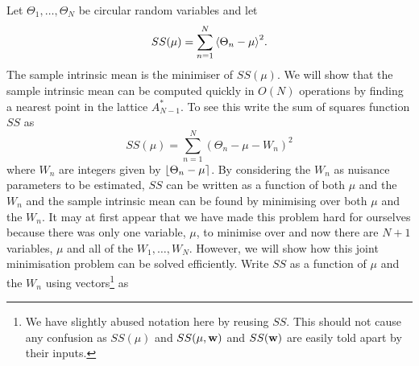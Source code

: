 \documentclass[journal]{IEEEtran}
\begin{document}
Let $\Theta_1,\dots,\Theta_N$ be circular random variables and let
\[
SS(\mu) = \sum_{n=1}^{N}{ \left< \Theta_n - \mu \right>^2 }.
\]
The sample intrinsic mean is the minimiser of $SS(\mu)$. 
We will show that the sample intrinsic mean can be computed quickly in $O(N)$ operations by finding a nearest point in the lattice $A_{N-1}^*$.  To see this write the sum of squares function $SS$ as
\[
SS(\mu) = \sum_{n=1}^{N}{ \left( \Theta_n - \mu - W_n \right)^2 }
\]
where $W_n$ are integers given by ${\left\lfloor \Theta_n - \mu \right\rceil}$. 
By considering the $W_n$ as nuisance parameters to be estimated, $SS$ can be written as a function of both $\mu$ and the $W_n$ and the sample intrinsic mean can be found by minimising over both $\mu$ and the $W_n$. It may at first appear that we have made this problem hard for ourselves because there was only one variable, $\mu$, to minimise over and now there are $N+1$ variables, $\mu$ and all of the $W_1, \dots, W_N$.  However, we will show how this joint minimisation problem can be solved efficiently.  Write $SS$ as a function of $\mu$ and the $W_n$ using vectors\footnote{We have slightly abused notation here by reusing $SS$. This should not cause any confusion as $SS(\mu)$ and $SS(\mu,\mathbf{w})$ and $SS(\mathbf{w})$ are easily told apart by their inputs.} as
\end{document}
